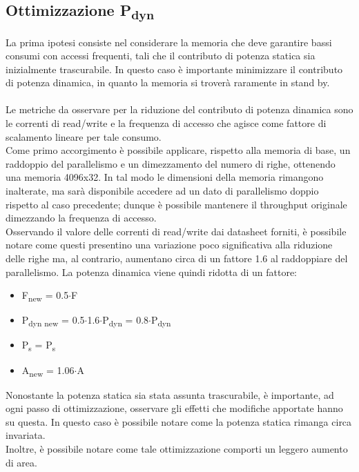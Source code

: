 \documentclass[11pt,  english, makeidx, a4paper, titlepage, oneside]{book}
\begin{document}
\subsection{Ottimizzazione P\textsubscript{dyn}}
La prima ipotesi consiste nel considerare la memoria che deve garantire bassi consumi con accessi frequenti, tali che il contributo di potenza statica sia inizialmente trascurabile. In questo caso è importante minimizzare il contributo di potenza dinamica, in quanto la memoria si troverà raramente in stand by.
\\\\
Le metriche da osservare per la riduzione del contributo di potenza dinamica sono le correnti di read/write e la frequenza di accesso che agisce come fattore di scalamento lineare per tale consumo.
\\
Come primo accorgimento è possibile applicare, rispetto alla memoria di base, un raddoppio del parallelismo e un dimezzamento del numero di righe, ottenendo una memoria 4096x32. In tal modo le dimensioni della memoria rimangono inalterate, ma sarà disponibile accedere ad un dato di parallelismo doppio rispetto al caso precedente; dunque è possibile mantenere il throughput originale dimezzando la frequenza di accesso.
\\
Osservando il valore delle correnti di read/write dai datasheet forniti, è possibile notare come questi presentino una variazione poco significativa alla riduzione delle righe ma, al contrario, aumentano circa di un fattore 1.6 al raddoppiare del parallelismo. La potenza dinamica viene quindi ridotta di un fattore:
\\
\begin{itemize}
\item F\textsubscript{new} = 0.5$\cdot$F
\item P\textsubscript{dyn new} = 0.5$\cdot$1.6$\cdot$P\textsubscript{dyn} = 0.8$\cdot$P\textsubscript{dyn}
\item P\textsubscript{s} = P\textsubscript{s}
\item A\textsubscript{new} = 1.06$\cdot$A
\end{itemize}
\vspace{0.3cm}
Nonostante la potenza statica sia stata assunta trascurabile, è importante, ad ogni passo di ottimizzazione, osservare gli effetti che modifiche apportate hanno su questa. In questo caso è possibile notare come la potenza statica rimanga circa invariata.
\\
Inoltre, è possibile notare come tale ottimizzazione comporti un leggero aumento di area.
\end{document}
